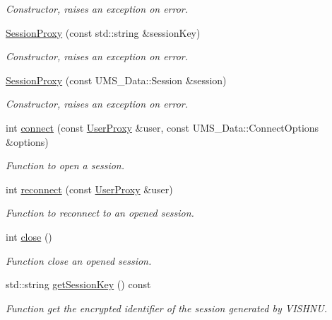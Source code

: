 \begin{DoxyCompactItemize}
\begin{DoxyCompactList}\small\item\em Constructor, raises an exception on error. \item\end{DoxyCompactList}\item 
\hyperlink{classSessionProxy_afdbe96782ff09eb64231d10eb3407d1a}{SessionProxy} (const std::string \&sessionKey)
\begin{DoxyCompactList}\small\item\em Constructor, raises an exception on error. \item\end{DoxyCompactList}\item 
\hyperlink{classSessionProxy_abcc89dfce2053ea7b2279bd29e11740c}{SessionProxy} (const UMS\_\-Data::Session \&session)
\begin{DoxyCompactList}\small\item\em Constructor, raises an exception on error. \item\end{DoxyCompactList}\item 
int \hyperlink{classSessionProxy_a43aac256a75c6edafc54a796e149a2f0}{connect} (const \hyperlink{classUserProxy}{UserProxy} \&user, const UMS\_\-Data::ConnectOptions \&options)
\begin{DoxyCompactList}\small\item\em Function to open a session. \item\end{DoxyCompactList}\item 
int \hyperlink{classSessionProxy_ac76a2d9a40b86bbe3ce28f77bc7c63ae}{reconnect} (const \hyperlink{classUserProxy}{UserProxy} \&user)
\begin{DoxyCompactList}\small\item\em Function to reconnect to an opened session. \item\end{DoxyCompactList}\item 
int \hyperlink{classSessionProxy_aee2dc147d8581ee731a8cda7bfac246f}{close} ()
\begin{DoxyCompactList}\small\item\em Function close an opened session. \item\end{DoxyCompactList}\item 
std::string \hyperlink{classSessionProxy_aaf9505d51053fb5e99f465970b55081f}{getSessionKey} () const 
\begin{DoxyCompactList}\small\item\em Function get the encrypted identifier of the session generated by VISHNU. \item\end{DoxyCompactList}\item 

\end{DoxyCompactItemize}
